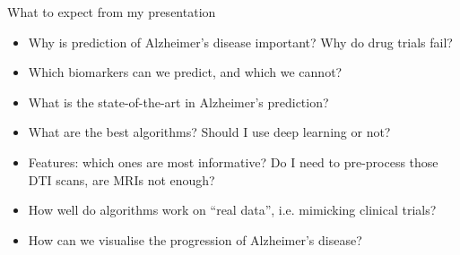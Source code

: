 \documentclass[8pt,xcolor=table,aspectratio=169]{beamer}
\begin{document}
\begin{frame}{What to expect from my presentation}
 
 \begin{itemize}
 
   \item Why is prediction of Alzheimer's disease important? Why do drug trials fail?
  
  \vspace{2em}
  
   \item Which biomarkers can we predict, and which we cannot?
  
  \vspace{2em}
  
   \item What is the state-of-the-art in Alzheimer's prediction?
  
  \vspace{2em}
  
   \item What are the best algorithms? Should I use deep learning or not?
  
  \vspace{2em}
   
   \item Features: which ones are most informative? Do I need to pre-process those DTI scans, are MRIs not enough?
  
  \vspace{2em}
  
   \item How well do algorithms work on ``real data'', i.e. mimicking clinical trials?
  
  \vspace{2em}
  
   \item How can we visualise the progression of Alzheimer's disease? 
  
 \end{itemize}

\end{frame}
\end{document}
